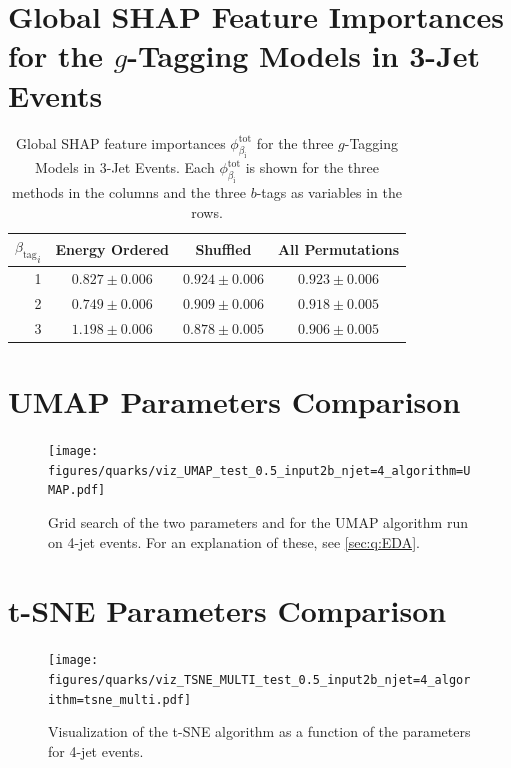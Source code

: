 \FloatBarrier
\section[Global SHAP Feature Importances for the g-Tagging Models in 3-Jet Events]{Global SHAP Feature Importances for the $g$-Tagging Models in 3-Jet Events}
\begin{table}[!ht]
  \centerfloat
  \begin{tabular}{@{}rccc@{}}
  ${\beta_\mathrm{tag}}_i$  & Energy Ordered & Shuffled & All Permutations \\ \midrule
1 & $ 0.827 \pm 0.006 $  &  $ 0.924 \pm 0.006 $  &  $ 0.923 \pm 0.006 $  \\
2 & $ 0.749 \pm 0.006 $  &  $ 0.909 \pm 0.006 $  &  $ 0.918 \pm 0.005 $  \\
3 & $ 1.198 \pm 0.006 $  &  $ 0.878 \pm 0.005 $  &  $ 0.906 \pm 0.005 $  \\
\end{tabular}
\caption[Global SHAP Feature Importances for the $g$-Tagging Models in 3-Jet Events]{Global SHAP feature importances $\phi^\mathrm{tot}_{\beta_\mathrm{i}}$ for the three $g$-Tagging Models in 3-Jet Events. Each $\phi^\mathrm{tot}_{\beta_\mathrm{i}}$ is shown for the three methods in the columns and the three $b$-tags as variables in the rows.}
\label{table:q:shap_g_taggging_global_3j}
\end{table}

\clearpage

\section{UMAP Parameters Comparison}
\begin{figure}[h!]
  \centerfloat
  \texttt{[image: figures/quarks/viz\_UMAP\_test\_0.5\_input2b\_njet=4\_algorithm=UMAP.pdf]}
  \caption[UMAP Parameter Grid Search]
          {Grid search of the two parameters  and  for the UMAP algorithm run on 4-jet events. For an explanation of these, see \autoref{sec:q:EDA}.} 
  \label{fig:q:UMAP_vertex_all_4j}
\end{figure}


\FloatBarrier
\section{t-SNE Parameters Comparison}

\begin{figure}[h!]
  \centerfloat
  \texttt{[image: figures/quarks/viz\_TSNE\_MULTI\_test\_0.5\_input2b\_njet=4\_algorithm=tsne\_multi.pdf]}
  \caption[Visualization of the t-SNE algorithm]
          {Visualization of the t-SNE algorithm as a function of the  parameters for 4-jet events.} 
  \label{fig:q:tsne_vertex}
\end{figure}
\clearpage




